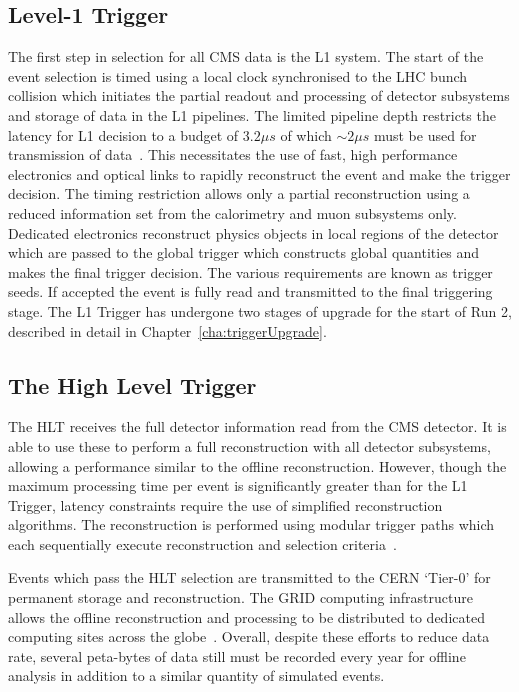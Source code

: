 \subsection{Level-1 Trigger}

The first step in selection for all CMS data is the L1 system. The start of the event selection is timed using a local clock
synchronised to the LHC bunch collision which initiates the partial readout and processing of detector subsystems and storage 
of data in the L1 pipelines. The limited pipeline depth restricts the latency for L1 decision to a budget of $3.2\mu s$
of which $\sim2\mu s$ must be used for transmission of data~\cite{daq_performance}. This necessitates the use of fast, high performance electronics
and optical links to rapidly reconstruct the event and make the trigger decision. The timing restriction allows only 
a partial reconstruction using a reduced information set from the calorimetry and muon subsystems only. Dedicated electronics
reconstruct physics objects in local regions of the detector which are passed to the global trigger which constructs global
quantities and makes the final trigger decision. The various requirements are known as trigger seeds. 
If accepted the event is fully read and transmitted to the final triggering
stage. The L1 Trigger has undergone two stages of upgrade for the start of Run 2, described in detail in Chapter~\ref{cha:triggerUpgrade}.

\subsection{The High Level Trigger}

The HLT receives the full detector information read from the CMS detector. It is able to use these to perform 
a full reconstruction with all detector subsystems, allowing a performance similar to the offline reconstruction. However, 
though the maximum processing time per event is significantly greater than for the L1 Trigger, latency constraints 
require the use of simplified reconstruction algorithms. The reconstruction is performed using modular trigger paths
which each sequentially execute reconstruction and selection criteria~\cite{daq_performance}. 

Events which pass the HLT selection are transmitted to the CERN `Tier-0' for permanent storage and reconstruction. 
The GRID computing infrastructure allows the offline reconstruction and processing to be distributed to dedicated 
computing sites across the globe~\cite{grid_tdr}. Overall, despite these efforts to reduce data rate, 
several peta-bytes of data still must be recorded every year for offline analysis in addition to 
a similar quantity of simulated events.

